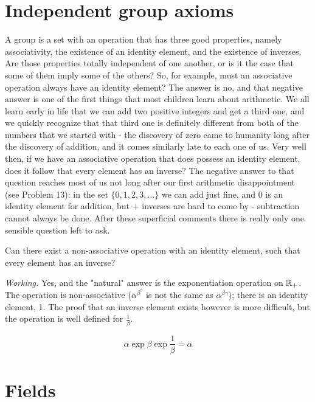 \section{Independent group axioms}

A group is a set with an operation that has three good properties, namely associativity, the existence of an identity element, and the existence of inverses. Are those properties totally independent of one another, or is it the case that some of them imply some of the others? So, for example, must an associative operation always have an identity element? The answer is no, and that negative answer is one of the first things that most children learn about arithmetic. We all learn early in life that we can add two positive integers and get a third one, and we quickly recognize that that third one is definitely different from both of the numbers that we started with - the discovery of zero came to humanity long after the discovery of addition, and it comes similarly late to each one of us. Very well then, if we have an associative operation that does possess an identity element, does it follow that every element has an inverse? The negative answer to that question reaches most of us not long after our first arithmetic disappointment (see Problem 13): in the set $\{0,1,2,3,...\}$ we can add just fine, and $0$ is an identity element for addition, but $+$ inverses are hard to come by - subtraction cannot always be done. After these superficial comments there is really only one sensible question left to ask.

\begin{problem}
Can there exist a non-associative operation with an identity element, such that every element has an inverse?
\end{problem}

\textit{Working.} Yes, and the "natural" answer is the exponentiation operation on $\mathbb{R}_+$. The operation is non-associative ($\alpha^{\beta^\gamma}$ is not the same as $\alpha^{\beta\gamma}$); there is an identity element, 1. The proof that an inverse element exists however is more difficult, but the operation is well defined for $\frac{1}{\beta}$.

\begin{equation}
    \alpha \exp \beta \exp \frac{1}{\beta} = \alpha
\end{equation}

\section{Fields}

